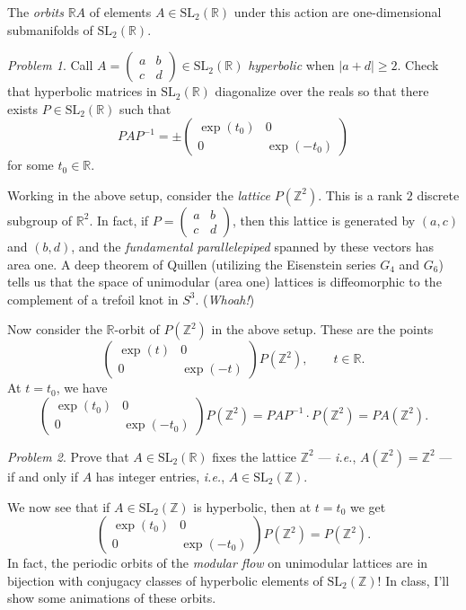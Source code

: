 \documentclass[11pt,twoside]{amsart}
\theoremstyle{plain}
\theoremstyle{remark}
\newtheorem{prob}{Problem}
\theoremstyle{definition}
\theoremstyle{definition}
\newcommand{\RR}{\mathbb{R}}
\newcommand{\ZZ}{\mathbb{Z}}
\newcommand{\SL}{\mathrm{SL}}
\begin{document}
The \emph{orbits} $\RR A$ of elements $A\in \SL_2(\RR)$ under this action are one-dimensional submanifolds of $\SL_2(\RR)$.

\begin{prob}
Call $A = \begin{pmatrix}a&b\\c&d\end{pmatrix}\in \SL_2(\RR)$ \emph{hyperbolic} when $|a+d|\ge 2$. Check that hyperbolic matrices in $\SL_2(\RR)$ diagonalize over the reals so that there exists $P\in \SL_2(\RR)$ such that
\[
  PAP^{-1} = \pm\begin{pmatrix}\exp(t_0)&0\\0&\exp(-t_0)\end{pmatrix}
\]
for some $t_0\in \RR$.
\end{prob}

Working in the above setup, consider the \emph{lattice} $P(\ZZ^2)$. This is a rank $2$ discrete subgroup of $\RR^2$. In fact, if $P = \begin{pmatrix}a&b\\c&d\end{pmatrix}$, then this lattice is generated by $(a,c)$ and $(b,d)$, and the \emph{fundamental parallelepiped} spanned by these vectors has area one. A deep theorem of Quillen (utilizing the Eisenstein series $G_4$ and $G_6$) tells us that the space of unimodular (area one) lattices is diffeomorphic to the complement of a trefoil knot in $S^3$. (\emph{Whoah!})

Now consider the $\RR$-orbit of $P(\ZZ^2)$ in the above setup. These are the points
\[
  \begin{pmatrix}
  \exp(t)&0\\0&\exp(-t)
  \end{pmatrix}P(\ZZ^2),\qquad t\in \RR.
\]
At $t=t_0$, we have
\[
  \begin{pmatrix}
  \exp(t_0)&0\\0&\exp(-t_0)
  \end{pmatrix}P(\ZZ^2)
  = PAP^{-1}\cdot P(\ZZ^2)
  = PA(\ZZ^2).
\]

\begin{prob}
Prove that $A\in \SL_2(\RR)$ fixes the lattice $\ZZ^2$ --- \emph{i.e.}, $A(\ZZ^2) = \ZZ^2$ --- if and only if $A$ has integer entries, \emph{i.e.}, $A\in \SL_2(\ZZ)$.
\end{prob}

We now see that if $A\in \SL_2(\ZZ)$ is hyperbolic, then at $t=t_0$ we get
\[
  \begin{pmatrix}
  \exp(t_0)&0\\0&\exp(-t_0)
  \end{pmatrix}P(\ZZ^2) = P(\ZZ^2).
\]
In fact, the periodic orbits of the \emph{modular flow} on unimodular lattices are in bijection with conjugacy classes of hyperbolic elements of $\SL_2(\ZZ)$! In class, I'll show some animations of these orbits.
\end{document}
